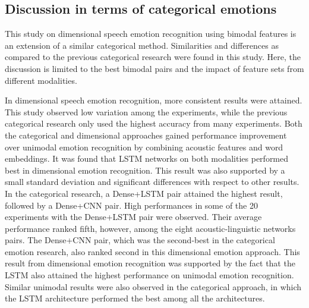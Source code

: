 \subsection{Discussion in terms of categorical emotions}
This study on dimensional speech emotion recognition using bimodal features is
an extension of a similar categorical method. Similarities and differences as
compared to the previous categorical research were found in this study. Here,
the discussion is limited to the best bimodal pairs and the impact of feature
sets from different modalities.

In dimensional speech emotion recognition, more consistent results were
attained. This study observed low variation among the experiments, while the
previous categorical research only used the highest accuracy from many
experiments. Both the categorical and dimensional approaches gained performance
improvement over unimodal emotion recognition by combining acoustic features
and word embeddings.  It was found that LSTM networks on both modalities
performed best in dimensional emotion recognition.  This result was also
supported by a small standard deviation and significant differences with
respect to other results.  In the categorical research, a Dense+LSTM pair
attained the highest result, followed by a Dense+CNN pair. High performances in
some of the 20 experiments with the Dense+LSTM pair were observed. Their average
performance ranked fifth, however, among the eight acoustic-linguistic networks
pairs.  The Dense+CNN pair, which was the second-best in the categorical
emotion research, also ranked second in this dimensional emotion approach. This
result from dimensional emotion recognition was supported by the fact that the
LSTM also attained the highest performance on unimodal emotion recognition.
Similar unimodal results were also observed in the categorical approach, in
which the LSTM architecture performed the best among all the architectures.


